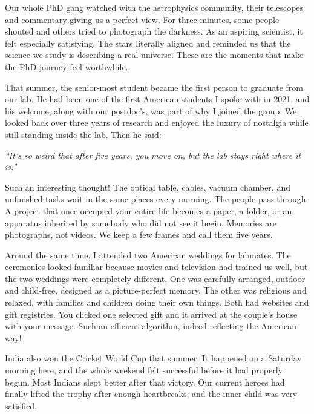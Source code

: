 \documentclass[11pt,twoside,openany]{book}
\newcommand{\scene}{\par\vspace{0.7em}{\centering\color{accent}\rule{0.85cm}{0.6pt}\par}\vspace{0.5em}\noindent\ignorespaces}
\begin{document}
Our whole PhD gang watched with the astrophysics community, their telescopes
and commentary giving us a perfect view. For three minutes, some people
shouted and others tried to photograph the darkness. As an aspiring scientist,
it felt especially satisfying. The stars literally aligned and reminded us
that the science we study is describing a real universe. These are the moments
that make the PhD journey feel worthwhile.

\scene

That summer, the senior-most student became the first person to graduate from
our lab. He had been one of the first American students I spoke with in 2021,
and his welcome, along with our postdoc's, was part of why I joined the group.
We looked back over three years of research and enjoyed the luxury of
nostalgia while still standing inside the lab. Then he said:

\begin{pquote}\itshape
``It's so weird that after five years, you move on, but the lab stays right where
it is.''
\end{pquote}

Such an interesting thought! The optical table, cables, vacuum chamber, and
unfinished tasks wait in the same places every morning. The people pass
through. A project that once occupied your entire life becomes a paper, a
folder, or an apparatus inherited by somebody who did not see it begin.
Memories are photographs, not videos. We keep a few frames and call them five
years.

\scene

Around the same time, I attended two American weddings for labmates. The
ceremonies looked familiar because movies and television had trained us well,
but the two weddings were completely different. One was carefully arranged,
outdoor and child-free, designed as a picture-perfect memory. The other was
religious and relaxed, with families and children doing their own things.
Both had websites and gift registries. You clicked one selected gift and it
arrived at the couple's house with your message. Such an efficient algorithm,
indeed reflecting the American way!

India also won the Cricket World Cup that summer. It happened on a Saturday
morning here, and the whole weekend felt successful before it had properly
begun. Most Indians slept better after that victory. Our current heroes had
finally lifted the trophy after enough heartbreaks, and the inner child was
very satisfied.
\end{document}
